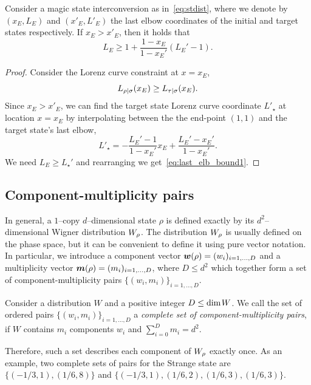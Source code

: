 \begin{proposition}\label{prop:last_elb}
	Consider a magic state interconversion as in~\cref{eq:stdist}, where we denote by $(x_E, L_E)$ and $(x'_E, L'_E)$ the last elbow coordinates of the initial and target states respectively.
	If $x_E > x'_E$, then it holds that
\begin{equation}\label{eq:last_elb_bound1}
	L_E \geq 1 + \frac{1-x_E}{1-x_E'} (L_E' - 1).
\end{equation}
\end{proposition}
\begin{proof}
	Consider the Lorenz curve constraint at $x = x_E$,
\begin{equation}
	{L_{\rho|\sigma}}(x_E) \geq {L_{\tau|\sigma}}(x_E).
\end{equation}
Since $x_E > x'_E$, we can find the target state Lorenz curve coordinate $L'_\star$ at location $x = x_E$ by interpolating between the the end-point $(1,1)$ and the target state's last elbow, 
\begin{equation}
	L'_\star = -\frac{L_E' - 1}{1 - x_E'}x_E + \frac{L_E' - x_E'}{1 - x_E'}.
\end{equation}
We need $L_E \geq L_\star'$ and rearranging we get~\cref{eq:last_elb_bound1}.
\end{proof}

\subsection{Component-multiplicity pairs}
\label{app:cmpairs}
In general, a $1$--copy $d$--dimensional state $\rho$ is defined exactly by its $d^2$--dimensional Wigner distribution $\W{\rho}$. 
The distribution $\W{\rho}$ is usually defined on the phase space, but it can be convenient to define it using pure vector notation. 
In particular, we introduce a component vector $\bm{w}(\rho) = (w_i)_{i=1,\dots,D}$ and a multiplicity vector $\bm{m}(\rho) = (m_i)_{i=1,\dots,D}$, where $D \leq d^2$ which together form a set of component-multiplicity pairs $\{(w_i, m_i)\}_{i=1,\dots,D}$.
\begin{definition}
	Consider a distribution $W$ and a positive integer $D \leq {\rm{dim}}\hspace{1pt}W$. 
	We call the set of ordered pairs $\{(w_i, m_i)\}_{i=1,\dots,D}$ a \emph{complete set of component-multiplicity pairs}, if $W$ contains $m_i$ components $w_i$ and $\sum_{i=0}^D m_i = d^2$.
\end{definition}
Therefore, such a set describes each component of $\W{\rho}$ exactly once.
As an example, two complete sets of pairs for the Strange state are $\{( -1/3, 1), ( 1/6, 8)\}$ and $\{(-1/3, 1), (1/6, 2), (1/6, 3), (1/6, 3)\}$.

